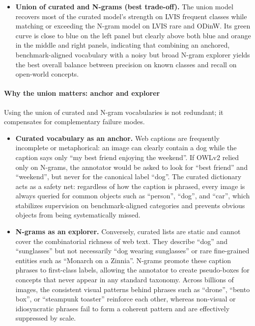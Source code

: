 \begin{enrichment}
\begin{enrichment}
\begin{itemize}
			\item \textbf{Union of curated and N-grams (best trade-off).}
			The union model recovers most of the curated model's strength on LVIS frequent classes while matching or exceeding the N-gram model on LVIS rare and ODinW.
			Its green curve is close to blue on the left panel but clearly above both blue and orange in the middle and right panels, indicating that combining an anchored, benchmark-aligned vocabulary with a noisy but broad N-gram explorer yields the best overall balance between precision on known classes and recall on open-world concepts.
		\end{itemize}
		
		\paragraph{Why the union matters: anchor and explorer}
		Using the union of curated and N-gram vocabularies is not redundant; it compensates for complementary failure modes.
		
		\begin{itemize}
			\item \textbf{Curated vocabulary as an anchor.}
			Web captions are frequently incomplete or metaphorical: an image can clearly contain a dog while the caption says only ``my best friend enjoying the weekend''.
			If OWLv2 relied only on N-grams, the annotator would be asked to look for ``best friend'' and ``weekend'', but never for the canonical label ``dog''.
			The curated dictionary acts as a safety net: regardless of how the caption is phrased, every image is always queried for common objects such as ``person'', ``dog'', and ``car'', which stabilizes supervision on benchmark-aligned categories and prevents obvious objects from being systematically missed.
			
			\item \textbf{N-grams as an explorer.}
			Conversely, curated lists are static and cannot cover the combinatorial richness of web text.
			They describe ``dog'' and ``sunglasses'' but not necessarily ``dog wearing sunglasses'' or rare fine-grained entities such as ``Monarch on a Zinnia''.
			N-grams promote these caption phrases to first-class labels, allowing the annotator to create pseudo-boxes for concepts that never appear in any standard taxonomy.
			Across billions of images, the consistent visual patterns behind phrases such as ``drone'', ``bento box'', or ``steampunk toaster'' reinforce each other, whereas non-visual or idiosyncratic phrases fail to form a coherent pattern and are effectively suppressed by scale.
		\end{itemize}
		

\end{enrichment}
\end{enrichment}
